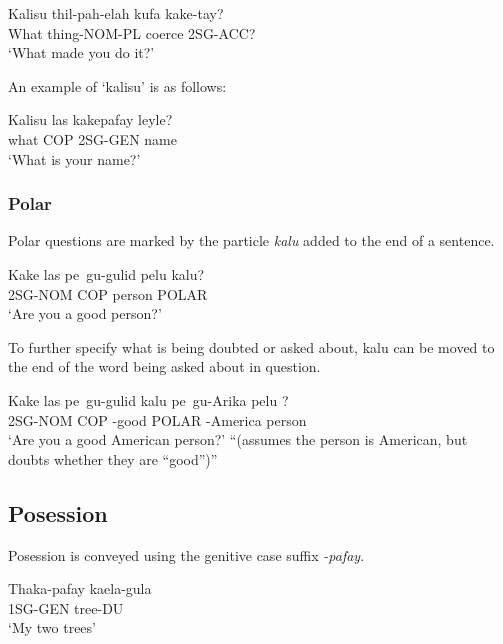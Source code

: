 \begin{exe}
    \ex{} \gll{}Kalisu thil-pah-elah kufa kake-tay?\\
    What thing-NOM-PL coerce 2SG-ACC?\\
    \glt{}`What made you do it?'
\end{exe}

An example of `kalisu' is as follows:

\begin{exe}
    \ex{} \gll{}Kalisu las kakepafay leyle?\\
    what COP 2SG-GEN name\\
    \glt{}`What is your name?'
\end{exe}

\subsubsection{Polar}
Polar questions are marked by the particle \emph{kalu} added to the end of a sentence.

\begin{exe}
    \ex{} \gll{}Kake las pe~gu-gulid pelu kalu?\\
    2SG-NOM COP \agradj{} person POLAR \\
    \glt{}`Are you a good person?'
\end{exe}

To further specify what is being doubted or asked about, kalu can be moved to the end of the word being asked about in question.

\begin{exe}
    \ex{} \gll{}Kake las pe~gu-gulid kalu pe~gu-Arika pelu ?\\
    2SG-NOM COP \agradj{}-good POLAR \agradj{}-America person \\
    \glt{}`Are you a good American person?'
    \glt{}``(assumes the person is American, but doubts whether they are ``good'')''
\end{exe}

\subsection{Posession}
Posession is conveyed using the genitive case suffix \emph{-pafay}.

\begin{exe}
    \ex{} \gll{}Thaka-pafay kaela-gula\\
    1SG-GEN tree-DU\\
    \glt{}`My two trees'
\end{exe}

